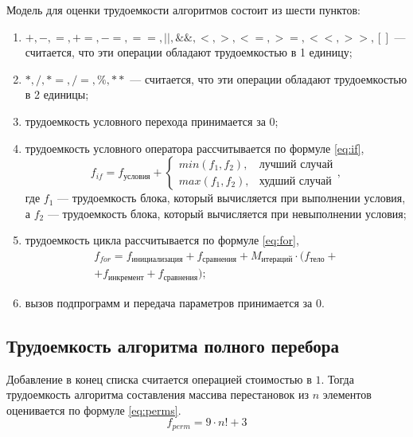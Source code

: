 Модель для оценки трудоемкости алгоритмов состоит из шести пунктов:
\begin{enumerate}
	\item $+, -, =, +=, -=, ==, ||, \&\&, <, >, <=, >=, <<, >>, []$ --- считается, что эти операции обладают трудоемкостью в 1 единицу;
	\item $*, /, *=, /=, \%, ** $ --- считается, что эти операции обладают трудоемкостью в 2 единицы;
	\item трудоемкость условного перехода принимается за $0$;
	\item трудоемкость условного оператора рассчитывается по формуле \eqref{eq:if},
	\begin{equation}
		\label{eq:if}
		f_{if} = f_{\text{условия}} + 
		\begin{cases}
			min(f_1, f_2), & \text{лучший случай}\\
			max(f_1, f_2), & \text{худший случай}
		\end{cases},
	\end{equation}
	где $f_1$ --- трудоемкость блока, который вычисляется при выполнении условия, а $f_2$ --- трудоемкость блока, который вычисляется при невыполнении условия;
	\item трудоемкость цикла рассчитывается по формуле \eqref{eq:for},
	\begin{equation}
		\label{eq:for}
		\begin{gathered}
			f_{for} = f_{\text{инициализация}} + f_{\text{сравнения}} + M_{\text{итераций}} \cdot (f_{\text{тело}} +\\
			+ f_{\text{инкремент}} + f_{\text{сравнения}});
		\end{gathered}
	\end{equation}
	\item вызов подпрограмм и передача параметров принимается за $0$.
\end{enumerate}

\subsection{Трудоемкость алгоритма полного перебора}

Добавление в конец списка считается операцией стоимостью в $1$. Тогда трудоемкость алгоритма составления массива перестановок из $n$ элементов оценивается по формуле \eqref{eq:perms}.
\begin{equation}
	\label{eq:perms}
	f_{perm} = 9 \cdot n! + 3
\end{equation}


